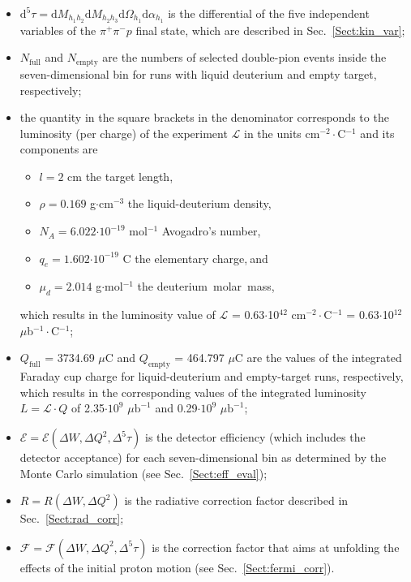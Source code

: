 \documentclass[prc,twocolumn,superscriptaddress,showpacs,amssymb,amsmath,amsfonts,aps,nofootinbib]{revtex4-1}
\begin{document}
\begin{itemize}
\item $\textrm{d}^{5}\tau = \textrm{d}M_{h_{1}h_{2}} \textrm{d}M_{h_{2}h_{3}} \textrm{d}\Omega_{h_1} \textrm{d}\alpha_{h_1}$ is the differential of the five independent variables of the $\pi^{+}\pi^{-}p$ final state, which are described in Sec.\!~\ref{Sect:kin_var};
\item $N_{\text{full}}$ and $N_{\text{empty}}$ are the numbers of selected double-pion events inside the seven-dimensional bin for runs with liquid deuterium and empty target, respectively;
\item the quantity in the square brackets in the denominator corresponds to the luminosity (per charge) of the experiment $\mathcal{L}$ in the units cm$^{-2}\cdot$C$^{-1}$ and its components are
\begin{itemize}
\item[]$\!\!\!\!\!\!\!\!$$l\!=\!2\!$ cm the target length,\vspace{-0.1em}
\item[]$\!\!\!\!\!\!\!\!$$\rho\!=\!0.169$ g$\cdot$cm$^{-3}$ the liquid-deuterium density,\vspace{-0.1em}
\item[ ]$\!\!\!\!\!\!\!\!$$N_{A}\!=\!6.022$$\cdot 10^{-19}$ mol$^{-1}$ Avogadro's number,\vspace{-0.1em}
\item[ ]$\!\!\!\!\!\!\!\!$$q_{e}\!=\!1.602$$\cdot 10^{-19}$ C the elementary charge,$\:$and\vspace{-0.1em}
\item[ ]$\!\!\!\!\!\!\!\!$$\mu_{d}\!=\!2.014$ g$\cdot$mol$^{-1}$ the deuterium~molar~mass,\vspace{-0.1em}
\end{itemize}
which results in the luminosity value of $\mathcal{L}$ = 0.63$\cdot$10$^{42}$ cm$^{-2}\cdot$C$^{-1}$ = 0.63$\cdot$10$^{12}$ $\mu$b$^{-1}\cdot$C$^{-1}$;


\item $Q_{\text{full}}$ = 3734.69 $\mu$C and $Q_{\text{empty}}$ = 464.797 $\mu$C are the values of the integrated Faraday cup charge for liquid-deuterium and empty-target runs, respectively, which results in the corresponding values of the integrated luminosity $L=\mathcal{L}\cdot Q$ of 2.35$\cdot 10^{9}$ $\mu \text{b}^{-1}$ and 0.29$\cdot 10^{9}$ $\mu \text{b}^{-1}$; 

\item $\mathcal{E} = \mathcal{E}(\Delta W, \Delta Q^{2}, \Delta^{5}\tau)$ is the detector efficiency (which includes the detector acceptance) for each seven-dimensional bin as determined by the Monte Carlo simulation (see Sec.\!~\ref{Sect:eff_eval}); 

\item $R = R(\Delta W, \Delta Q^{2})$ is the radiative correction factor described in Sec.\!~\ref{Sect:rad_corr}; 

\item $\mathcal{F} = \mathcal{F}(\Delta W, \Delta Q^{2}, \Delta^{5}\tau)$ is the correction factor that aims at unfolding the effects of the initial proton motion (see Sec.\!~\ref{Sect:fermi_corr}).

\end{itemize}
\end{document}
